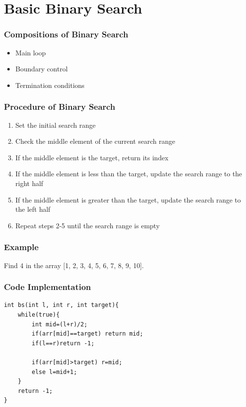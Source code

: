 \documentclass[xcolor=dvipsnames]{beamer}
\begin{document}
    \section{Basic Binary Search}

    \begin{frame}
        \frametitle{Compositions of Binary Search}
        \begin{itemize}
            \item Main loop
            \item Boundary control
            \item Termination conditions
        \end{itemize}
    \end{frame}

    \begin{frame}
        \frametitle{Procedure of Binary Search}
        \begin{enumerate}
            \item Set the initial search range
            \item Check the middle element of the current search range
            \item If the middle element is the target, return its index
            \item If the middle element is less than the target, update the search range to the right half
            \item If the middle element is greater than the target, update the search range to the left half
            \item Repeat steps 2-5 until the search range is empty
        \end{enumerate}
    \end{frame}
    \begin{frame}
        \frametitle{Example}
        Find 4 in the array [1, 2, 3, 4, 5, 6, 7, 8, 9, 10].\\
    \end{frame}

    \begin{frame}[fragile]
        \frametitle{Code Implementation}
        \begin{verbatim}
int bs(int l, int r, int target){
    while(true){
        int mid=(l+r)/2;
        if(arr[mid]==target) return mid;
        if(l==r)return -1;
        
        if(arr[mid]>target) r=mid;
        else l=mid+1;
    }
    return -1;
}            
        \end{verbatim}
    \end{frame}
\end{document}
